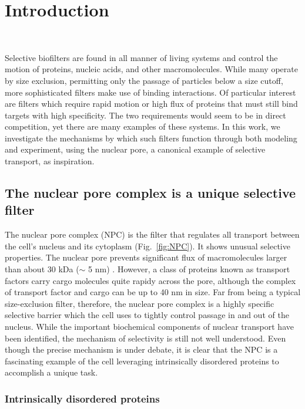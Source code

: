 \chapter{Introduction}~\label{ch01_introduction}

Selective biofilters are found in all manner of living systems and control the motion of proteins, nucleic acids, and other macromolecules.  While many operate by size exclusion, permitting only the passage of particles below a size cutoff, more sophisticated filters make use of binding interactions.  Of particular interest are filters which require rapid motion or high flux of proteins that must still bind targets with high specificity.  The two requirements would seem to be in direct competition, yet there are many examples of these systems.  In this work, we investigate the mechanisms by which such filters function through both modeling and experiment, using the nuclear pore, a canonical example of selective transport, as inspiration.

\section{The nuclear pore complex is a unique selective filter}

The nuclear pore complex (NPC) is the filter that regulates all transport between the cell's nucleus and its cytoplasm (Fig.~\ref{fig:NPC}).  It shows unusual selective properties. The nuclear pore prevents significant flux of macromolecules larger than about 30 kDa ($\sim$ 5 nm) \cite{timney16}.  However, a class of proteins known as transport factors carry cargo molecules quite rapidy across the pore, although the complex of transport factor and cargo can be up to 40 nm in size.  Far from being a typical size-exclusion filter, therefore, the nuclear pore complex is a highly specific selective barrier which the cell uses to tightly control passage in and out of the nucleus. While the important biochemical components of nuclear transport have been identified, the mechanism of selectivity is still not well understood.  Even though the precise mechanism is under debate, it is clear that the NPC is a fascinating example of the cell leveraging intrinsically disordered proteins to accomplish a unique task.

\subsection{Intrinsically disordered proteins}

